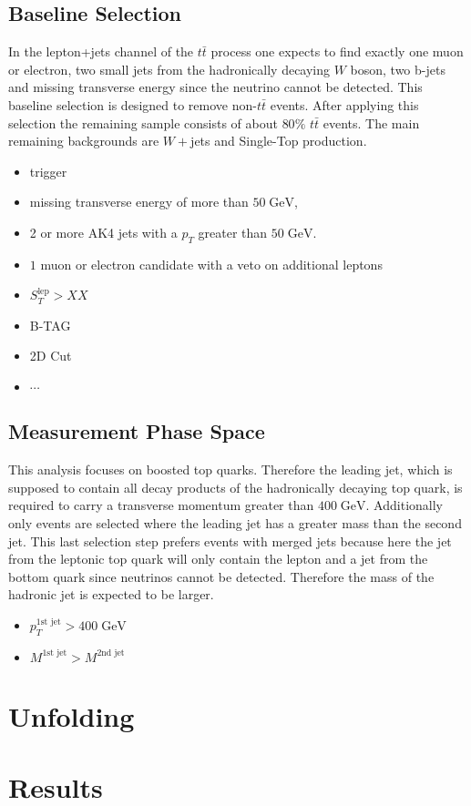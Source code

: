 \subsection{Baseline Selection}
\label{sec:PreSel}
	In the lepton+jets channel of the $t\bar{t}$ process one expects to find exactly one muon or electron, two small jets from the hadronically decaying $W$ boson, two b-jets and missing transverse energy since the neutrino cannot be detected. This baseline selection is designed to remove non-$t\bar{t}$ events. After applying this selection the remaining sample consists of about $80\%$ $t\bar{t}$ events. The main remaining backgrounds are $W+$jets and Single-Top production. 
	\begin{itemize}
	\item trigger
	\item missing transverse energy of more than $50\;\text{GeV}$,
	\item 2 or more AK4 jets with a $p_T$ greater than $50\;\text{GeV}$.
	\item $1$ muon or electron candidate with a veto on additional leptons
	\item $S_T^\text{lep} > XX$
	\item B-TAG
	\item 2D Cut
	\item $\cdots$	
	\end{itemize}
	
 

\subsection{Measurement Phase Space}
\label{sec:FinalSel}
	This analysis focuses on boosted top quarks. Therefore the leading jet, which is supposed to contain all decay products of the hadronically decaying top quark, is required to carry a transverse momentum greater than $400\;\text{GeV}$. Additionally only events are selected where the leading jet has a greater mass than the second jet. This last selection step prefers events with merged jets because here the jet from the leptonic top quark will only contain the lepton and a jet from the bottom quark since neutrinos cannot be detected. Therefore the mass of the hadronic jet is expected to be larger.
	\begin{itemize}
	\item $p_T^{\text{1st jet}} > 400\;\text{GeV}$ 
	\item $M^{\text{1st jet}} > M^{\text{2nd jet}}$
	\end{itemize}

\section{Unfolding}
\section{Results}
